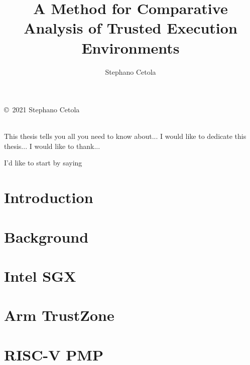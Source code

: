 \documentclass[12pt,oneside,letterpaper,hidelinks]{PSUreport}
\begin{document}
\title{A Method for Comparative Analysis of Trusted Execution Environments}
\subtitle{}
\author{Stephano Cetola}
\submitdate{\today}

\copyrightfalse
\figurespagetrue
\tablespagetrue
\beforepreface
\null\vfill
\begin{center}
        \copyright\ 2021 Stephano Cetola \\
        \doclicenseLongText \\
        \vspace{5 mm}
        \doclicenseImage
\end{center}
\vfill\newpage

This thesis tells you all you need to know about...
I would like to dedicate this thesis...
I would like to thank...
\afterpreface

\printglossary[type=\acronymtype]
\printglossary

I'd like to start by saying




\glsresetall
\chapter{Introduction}
\label{chap:intro}


\glsresetall
\chapter{Background}
\label{chap:bg}


\glsresetall
\chapter{Intel SGX}
\label{chap:sgx}


\glsresetall
\chapter{Arm TrustZone}
\label{chap:trustzone}


\glsresetall
\chapter{RISC-V PMP}
\label{chap:pmp}

\end{document}
